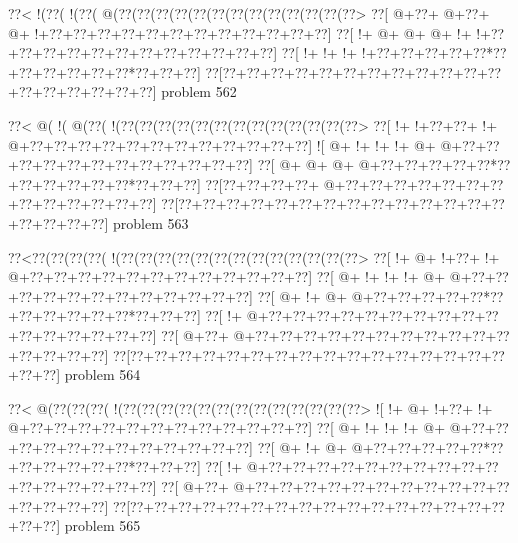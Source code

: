 \vbox{\vbox{\goo
\0??<\- !(\0??(\- !(\0??(\- @(\0??(\0??(\0??(\0??(\0??(\0??(\0??(\0??(\0??(\0??(\0??(\0??(\0??>
\0??[\- @+\0??+\- @+\0??+\- @+\- !+\0??+\0??+\0??+\0??+\0??+\0??+\0??+\0??+\0??+\0??+\0??+\0??]
\0??[\- !+\- @+\- @+\- @+\- !+\- !+\0??+\0??+\0??+\0??+\0??+\0??+\0??+\0??+\0??+\0??+\0??+\0??]
\0??[\- !+\- !+\- !+\- !+\0??+\0??+\0??+\0??+\0??*\0??+\0??+\0??+\0??+\0??+\0??*\0??+\0??+\0??]
\0??[\0??+\0??+\0??+\0??+\0??+\0??+\0??+\0??+\0??+\0??+\0??+\0??+\0??+\0??+\0??+\0??+\0??+\0??]
}
\hfil problem 562\hfil\break
}



\vbox{\vbox{\goo
\0??<\- @(\- !(\- @(\0??(\- !(\0??(\0??(\0??(\0??(\0??(\0??(\0??(\0??(\0??(\0??(\0??(\0??(\0??>
\0??[\- !+\- !+\0??+\0??+\- !+\- @+\0??+\0??+\0??+\0??+\0??+\0??+\0??+\0??+\0??+\0??+\0??+\0??]
\- ![\- @+\- !+\- !+\- !+\- @+\- @+\0??+\0??+\0??+\0??+\0??+\0??+\0??+\0??+\0??+\0??+\0??+\0??]
\0??[\- @+\- @+\- @+\- @+\0??+\0??+\0??+\0??+\0??*\0??+\0??+\0??+\0??+\0??+\0??*\0??+\0??+\0??]
\0??[\0??+\0??+\0??+\0??+\- @+\0??+\0??+\0??+\0??+\0??+\0??+\0??+\0??+\0??+\0??+\0??+\0??+\0??]
\0??[\0??+\0??+\0??+\0??+\0??+\0??+\0??+\0??+\0??+\0??+\0??+\0??+\0??+\0??+\0??+\0??+\0??+\0??]
}
\hfil problem 563\hfil\break
}



\vbox{\vbox{\goo
\0??<\0??(\0??(\0??(\0??(\- !(\0??(\0??(\0??(\0??(\0??(\0??(\0??(\0??(\0??(\0??(\0??(\0??(\0??>
\0??[\- !+\- @+\- !+\0??+\- !+\- @+\0??+\0??+\0??+\0??+\0??+\0??+\0??+\0??+\0??+\0??+\0??+\0??]
\0??[\- @+\- !+\- !+\- !+\- @+\- @+\0??+\0??+\0??+\0??+\0??+\0??+\0??+\0??+\0??+\0??+\0??+\0??]
\0??[\- @+\- !+\- @+\- @+\0??+\0??+\0??+\0??+\0??*\0??+\0??+\0??+\0??+\0??+\0??*\0??+\0??+\0??]
\0??[\- !+\- @+\0??+\0??+\0??+\0??+\0??+\0??+\0??+\0??+\0??+\0??+\0??+\0??+\0??+\0??+\0??+\0??]
\0??[\- @+\0??+\- @+\0??+\0??+\0??+\0??+\0??+\0??+\0??+\0??+\0??+\0??+\0??+\0??+\0??+\0??+\0??]
\0??[\0??+\0??+\0??+\0??+\0??+\0??+\0??+\0??+\0??+\0??+\0??+\0??+\0??+\0??+\0??+\0??+\0??+\0??]
}
\hfil problem 564\hfil\break
}



\vbox{\vbox{\goo
\0??<\- @(\0??(\0??(\0??(\- !(\0??(\0??(\0??(\0??(\0??(\0??(\0??(\0??(\0??(\0??(\0??(\0??(\0??>
\- ![\- !+\- @+\- !+\0??+\- !+\- @+\0??+\0??+\0??+\0??+\0??+\0??+\0??+\0??+\0??+\0??+\0??+\0??]
\0??[\- @+\- !+\- !+\- !+\- @+\- @+\0??+\0??+\0??+\0??+\0??+\0??+\0??+\0??+\0??+\0??+\0??+\0??]
\0??[\- @+\- !+\- @+\- @+\0??+\0??+\0??+\0??+\0??*\0??+\0??+\0??+\0??+\0??+\0??*\0??+\0??+\0??]
\0??[\- !+\- @+\0??+\0??+\0??+\0??+\0??+\0??+\0??+\0??+\0??+\0??+\0??+\0??+\0??+\0??+\0??+\0??]
\0??[\- @+\0??+\- @+\0??+\0??+\0??+\0??+\0??+\0??+\0??+\0??+\0??+\0??+\0??+\0??+\0??+\0??+\0??]
\0??[\0??+\0??+\0??+\0??+\0??+\0??+\0??+\0??+\0??+\0??+\0??+\0??+\0??+\0??+\0??+\0??+\0??+\0??]
}
\hfil problem 565\hfil\break
}



